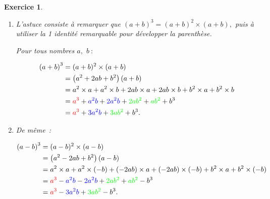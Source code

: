 \documentclass[10pt]{article}
\newtheorem{exo}{Exercice}
\begin{document}
\begin{exo}



\begin{enumerate}
\item L'astuce consiste à remarquer que $\left(a+b\right)^3=(a+b)^2\times (a+b),$ puis à utiliser la 1 identité remarquable pour développer la parenthèse.

\medskip

Pour tous nombres $a,$ $b~:$

\begin{align*}
\left(a+b\right)^3&=(a+b)^2\times (a+b)\\
&=\left(a^2+2ab+b^2\right)(a+b)\\
&=a^2\times a+a^2\times b+2ab\times a+2ab\times b+b^2\times a+b^2\times b\\
&=\textcolor{red}{a^3}+\textcolor{blue}{a^2b}+\textcolor{blue}{2a^2b}+\textcolor{green}{2ab^2}+\textcolor{green}{ab^2}+b^3\\
&=\textcolor{red}{a^3}+\textcolor{blue}{3a^2b}+\textcolor{green}{3ab^2}+b^3.\end{align*}
\item De même~:

\begin{align*}
\left(a-b\right)^3&=(a-b)^2\times (a-b)\\
&=\left(a^2-2ab+b^2\right)(a-b)\\
&=a^2\times a+a^2\times (-b)+(-2ab)\times a+(-2ab)\times (-b)+b^2\times a+b^2\times (-b)\\
&=\textcolor{red}{a^3}-\textcolor{blue}{a^2b}-\textcolor{blue}{2a^2b}+\textcolor{green}{2ab^2}+\textcolor{green}{ab^2}-b^3\\
&=\textcolor{red}{a^3}-\textcolor{blue}{3a^2b}+\textcolor{green}{3ab^2}-b^3.\end{align*}

\end{enumerate}

\end{exo}
\end{document}

